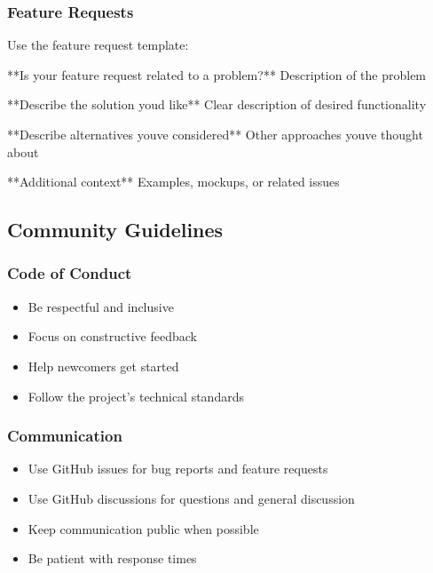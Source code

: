 \documentclass[letterpaper,10pt,english]{sphinxmanual}
\begin{document}
\subsubsection{Feature Requests}
\label{\detokenize{developer/contributing:feature-requests}}
\sphinxAtStartPar
Use the feature request template:

\begin{sphinxVerbatim}[commandchars=\\\{\}]
**Is your feature request related to a problem?**
Description of the problem

**Describe the solution you\PYGZsq{}d like**
Clear description of desired functionality

**Describe alternatives you\PYGZsq{}ve considered**
Other approaches you\PYGZsq{}ve thought about

**Additional context**
Examples, mockups, or related issues
\end{sphinxVerbatim}


\subsection{Community Guidelines}
\label{\detokenize{developer/contributing:community-guidelines}}

\subsubsection{Code of Conduct}
\label{\detokenize{developer/contributing:code-of-conduct}}\begin{itemize}
\item {} 
\sphinxAtStartPar
Be respectful and inclusive

\item {} 
\sphinxAtStartPar
Focus on constructive feedback

\item {} 
\sphinxAtStartPar
Help newcomers get started

\item {} 
\sphinxAtStartPar
Follow the project’s technical standards

\end{itemize}


\subsubsection{Communication}
\label{\detokenize{developer/contributing:communication}}\begin{itemize}
\item {} 
\sphinxAtStartPar
Use GitHub issues for bug reports and feature requests

\item {} 
\sphinxAtStartPar
Use GitHub discussions for questions and general discussion

\item {} 
\sphinxAtStartPar
Keep communication public when possible

\item {} 
\sphinxAtStartPar
Be patient with response times

\end{itemize}
\end{document}
